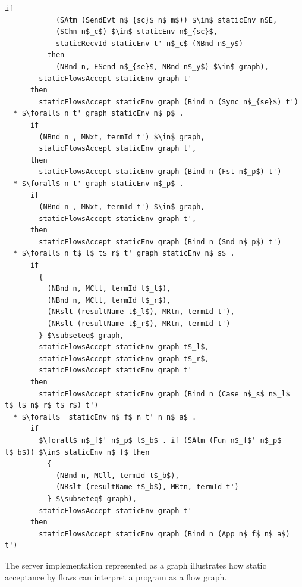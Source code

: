\documentclass[letterpaper, 11pt]{extarticle}
\begin{document}
\begin{lstlisting}[language=logic, mathescape]
          if
            (SAtm (SendEvt n$_{sc}$ n$_m$)) $\in$ staticEnv nSE, 
            (SChn n$_c$) $\in$ staticEnv n$_{sc}$,
            staticRecvId staticEnv t' n$_c$ (NBnd n$_y$)
          then
            (NBnd n, ESend n$_{se}$, NBnd n$_y$) $\in$ graph),
        staticFlowsAccept staticEnv graph t'
      then
        staticFlowsAccept staticEnv graph (Bind n (Sync n$_{se}$) t')
  * $\forall$ n t' graph staticEnv n$_p$ .
      if
        (NBnd n , MNxt, termId t') $\in$ graph,
        staticFlowsAccept staticEnv graph t',
      then
        staticFlowsAccept staticEnv graph (Bind n (Fst n$_p$) t')
  * $\forall$ n t' graph staticEnv n$_p$ .
      if
        (NBnd n , MNxt, termId t') $\in$ graph,
        staticFlowsAccept staticEnv graph t',
      then
        staticFlowsAccept staticEnv graph (Bind n (Snd n$_p$) t')
  * $\forall$ n t$_l$ t$_r$ t' graph staticEnv n$_s$ .
      if
        {
          (NBnd n, MCll, termId t$_l$),
          (NBnd n, MCll, termId t$_r$),
          (NRslt (resultName t$_l$), MRtn, termId t'),
          (NRslt (resultName t$_r$), MRtn, termId t')
        } $\subseteq$ graph,
        staticFlowsAccept staticEnv graph t$_l$,
        staticFlowsAccept staticEnv graph t$_r$,
        staticFlowsAccept staticEnv graph t'
      then
        staticFlowsAccept staticEnv graph (Bind n (Case n$_s$ n$_l$ t$_l$ n$_r$ t$_r$) t')
  * $\forall$  staticEnv n$_f$ n t' n n$_a$ .
      if
        $\forall$ n$_f$' n$_p$ t$_b$ . if (SAtm (Fun n$_f$' n$_p$ t$_b$)) $\in$ staticEnv n$_f$ then 
          {
            (NBnd n, MCll, termId t$_b$),
            (NRslt (resultName t$_b$), MRtn, termId t')
          } $\subseteq$ graph),
        staticFlowsAccept staticEnv graph t'
      then
        staticFlowsAccept staticEnv graph (Bind n (App n$_f$ n$_a$) t')
\end{lstlisting}

The server implementation represented as a graph illustrates how static acceptance by
flows can interpret a program as a flow graph.
\end{document}
